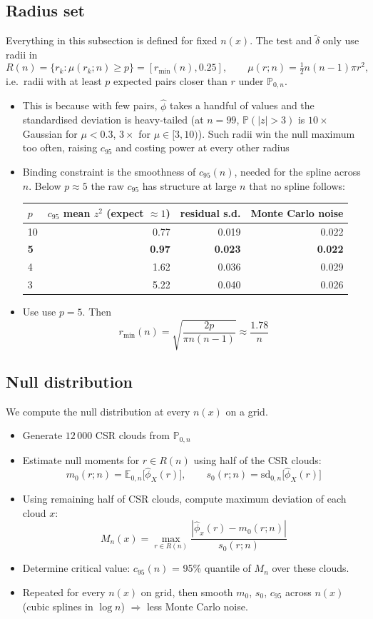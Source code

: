 \documentclass[11pt]{article}
\newcommand{\dt}{\tilde\delta}
\begin{document}
\subsection*{Radius set}
Everything in this subsection is defined for fixed $n(x)$. The test and $\dt$ only use radii in
\[
  R(n) = \{r_k : \mu(r_k;n) \ge p\} = [r_{\min}(n), 0.25],
  \qquad
  \mu(r;n) = \tfrac12 n(n-1)\pi r^2,
\]
i.e.\ radii with at least $p$ expected pairs closer than $r$ under $\mathbb P_{0,n}$.
\begin{itemize}
  \item This is because with few pairs, $\hat\phi$ takes a handful of values and the standardised deviation is heavy-tailed (at $n=99$, $\mathbb P(|z|>3)$ is $10\times$ Gaussian for $\mu<0.3$, $3\times$ for $\mu\in[3,10)$). Such radii win the null maximum too often, raising $c_{95}$ and costing power at every other radius
  \item Binding constraint is the smoothness of $c_{95}(n)$, needed for the spline across $n$. Below $p\approx5$ the raw $c_{95}$ has structure at large $n$ that no spline follows:

  \smallskip
  \begin{tabular}{@{}lrrr@{}}
  \toprule
  $p$ & $c_{95}$ mean $z^2$ (expect $\approx1$) & residual s.d. & Monte Carlo noise \\
  \midrule
  10 & 0.77 & 0.019 & 0.022 \\
  \textbf{5} & \textbf{0.97} & \textbf{0.023} & \textbf{0.022} \\
  4 & 1.62 & 0.036 & 0.029 \\
  3 & 5.22 & 0.040 & 0.026 \\
  \bottomrule
  \end{tabular}

  \smallskip
  \item Use use $p=5$. Then
  \[
    r_{\min}(n) = \sqrt{\frac{2p}{\pi n(n-1)}} \approx \frac{1.78}{n}
  \]
\end{itemize}

\subsection*{Null distribution}
We compute the null distribution at every $n(x)$ on a grid.
\begin{itemize}
  \item Generate $12\,000$ CSR clouds from $\mathbb P_{0,n}$
  \item Estimate null moments for $r \in R(n)$ using half of the CSR clouds:
  \[
    m_0(r;n) = \mathbb E_{0,n}\big[\hat\phi_X(r)\big],
    \qquad
    s_0(r;n) = \mathrm{sd}_{0,n}\big[\hat\phi_X(r)\big]
  \]
  \item Using remaining half of CSR clouds, compute maximum deviation of each cloud $x$:
  \[
    M_n(x) = \max_{r\in R(n)} \frac{|\hat\phi_x(r) - m_0(r;n)|}{s_0(r;n)}
  \]
  \item Determine critical value: $c_{95}(n)$ = 95\% quantile of $M_n$ over these clouds.
  \item Repeated for every $n(x)$ on grid, then smooth $m_0$, $s_0$, $c_{95}$ across $n(x)$ (cubic splines in $\log n$) $\Rightarrow$ less Monte Carlo noise.
\end{itemize}
\end{document}
